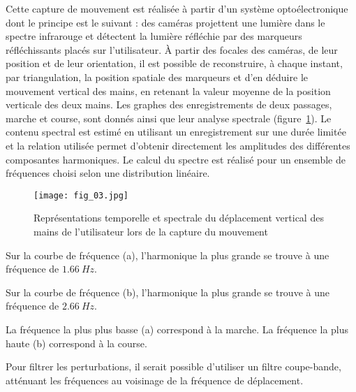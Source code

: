 Cette capture de mouvement est réalisée à partir d'un système optoélectronique dont le principe est le suivant : des caméras projettent une lumière dans le spectre infrarouge et détectent la lumière réfléchie par des marqueurs réfléchissants placés sur l'utilisateur. À partir des focales des caméras, de leur position et de leur orientation, il est possible de reconstruire, à chaque instant, par triangulation, la position spatiale des marqueurs et d'en déduire le mouvement vertical des mains, en retenant la valeur moyenne de la position verticale des deux mains. Les graphes des enregistrements de deux passages, marche et course, sont donnés ainsi que leur analyse spectrale (figure~\ref{fig:03}). Le contenu spectral est estimé en utilisant un enregistrement sur une durée limitée et la relation utilisée permet d'obtenir directement les amplitudes des différentes composantes harmoniques. Le calcul du spectre est réalisé pour un ensemble de fréquences choisi selon une distribution linéaire.


\begin{figure}[H]
\centering
\texttt{[image: fig\_03.jpg]}
\caption{\label{fig:03} Représentations temporelle et spectrale du déplacement vertical des mains de l'utilisateur lors de la capture du mouvement}
\end{figure}
\fi
 
\ifprof
\begin{corrige}
Sur la courbe de fréquence (a), l’harmonique la plus grande se trouve à une fréquence de $\SI{1,66}{Hz}$.

Sur la courbe de fréquence (b), l’harmonique la plus grande se trouve à une fréquence de $\SI{2,66}{Hz}$.

La fréquence la plus plus basse (a) correspond à la marche. La fréquence la plus haute (b) correspond à la course.

\end{corrige}
\else
\fi

\ifprof
\begin{corrige}

Pour filtrer les perturbations, il serait possible d'utiliser un filtre coupe-bande, atténuant les fréquences au voisinage de la fréquence de déplacement.
\end{corrige}
\else
\fi
